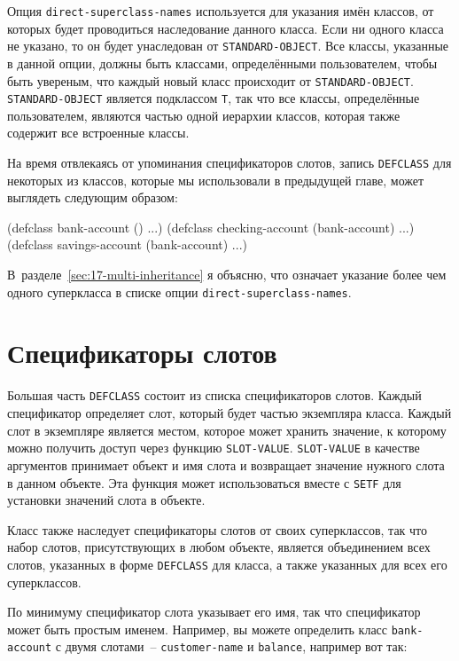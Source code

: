 Опция \lstinline{direct-superclass-names} используется для указания имён классов, от которых
будет проводиться наследование данного класса.  Если ни одного класса не указано, то он
будет унаследован от \lstinline{STANDARD-OBJECT}.  Все классы, указанные в данной опции, должны
быть классами, определёнными пользователем, чтобы быть увереным, что каждый новый класс
происходит от \lstinline{STANDARD-OBJECT}.  \lstinline{STANDARD-OBJECT} является подклассом
\lstinline{T}, так что все классы, определённые пользователем, являются частью одной иерархии
классов, которая также содержит все встроенные классы.

На время отвлекаясь от упоминания спецификаторов слотов, запись \lstinline{DEFCLASS} для
некоторых из классов, которые мы использовали в предыдущей главе, может выглядеть
следующим образом:

\begin{myverb}
(defclass bank-account () ...)
(defclass checking-account (bank-account) ...)
(defclass savings-account (bank-account) ...)
\end{myverb}

В~разделе~\ref{sec:17-multi-inheritance} я объясню, что означает указание более чем одного
суперкласса в списке опции \lstinline{direct-superclass-names}.

\section{Спецификаторы слотов}

Большая часть \lstinline{DEFCLASS} состоит из списка спецификаторов слотов.  Каждый
спецификатор определяет слот, который будет частью экземпляра класса.  Каждый слот в
экземпляре является местом, которое может хранить значение, к которому можно получить
доступ через функцию \lstinline{SLOT-VALUE}. \lstinline{SLOT-VALUE} в качестве аргументов принимает
объект и имя слота и возвращает значение нужного слота в данном объекте.  Эта функция
может использоваться вместе с \lstinline{SETF} для установки значений слота в объекте.

Класс также наследует спецификаторы слотов от своих суперклассов, так что набор слотов,
присутствующих в любом объекте, является объединением всех слотов, указанных в форме
\lstinline{DEFCLASS} для класса, а также указанных для всех его суперклассов.

По минимуму спецификатор слота указывает его имя, так что спецификатор может быть простым
именем.  Например, вы можете определить класс \lstinline{bank-account} с двумя слотами~--
\lstinline{customer-name} и \lstinline{balance}, например вот так:

